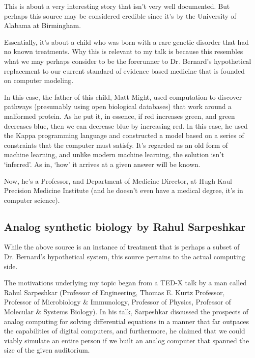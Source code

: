 This is about a very interesting story that isn't very well documented. But perhaps this source may be considered credible since it's by the University of Alabama at Birmingham.

Essentially, it's about a child who was born with a rare genetic disorder that had no known treatments. Why this is relevant to my talk is because this resembles what we may perhaps consider to be the forerunner to Dr. Bernard's hypothetical replacement to our current standard of evidence based medicine that is founded on computer modeling.

In this case, the father of this child, Matt Might, used computation to discover pathways (presumably using open biological databases) that work around a malformed protein. As he put it, in essence, if red increases green, and green decreases blue, then we can decrease blue by increasing red. In this case, he used the Kappa programming language and constructed a model based on a series of constraints that the computer must satisfy. It's regarded as an old form of machine learning, and unlike modern machine learning, the solution isn’t ‘inferred’. As in, ‘how’ it arrives at a given answer will be known.

Now, he’s a Professor, and Department of Medicine Director, at Hugh Kaul Precision Medicine Institute (and he doesn't even have a medical degree, it's in computer science).

\subsection{Analog synthetic biology by Rahul Sarpeshkar}


While the above source is an instance of treatment that is perhaps a subset of Dr. Bernard's hypothetical system, this source pertains to the actual computing side. 

The motivations underlying my topic began from a TED-X talk by a man called Rahul Sarpeshkar (Professor of Engineering, Thomas E. Kurtz Professor, Professor of Microbiology \& Immunology, Professor of Physics, Professor of Molecular \& Systems Biology). In his talk, Sarpeshkar discussed the prospects of analog computing for solving differential equations in a manner that far outpaces the capabilities of digital computers, and furthermore, he claimed that we could viably simulate an entire person if we built an analog computer that spanned the size of the given auditorium.

